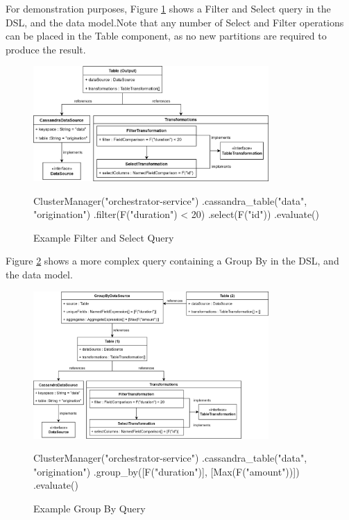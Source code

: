 For demonstration purposes, Figure \ref{fig:filter-select-query} shows a Filter and Select query in the DSL, and the data model.Note that any number of Select and Filter operations can be placed in the Table component, as no new partitions are required to produce the result.

\begin{figure}[h]
	\centering
	\includegraphics[width=0.8\textwidth]{chapters/diagrams/implementation/filter-select-query}
	\begin{python}
ClusterManager("orchestrator-service")
.cassandra_table("data", "origination")
.filter(F("duration") < 20)
.select(F("id"))
.evaluate()
	\end{python}
	\caption{Example Filter and Select Query}
	\label{fig:filter-select-query}
\end{figure}


Figure \ref{fig:group-by-query} shows a more complex query containing a Group By in the DSL, and the data model.

\begin{figure}[h]
	\centering
	\includegraphics[width=0.8\textwidth]{chapters/diagrams/implementation/group-by-query}
	\linebreak
	\begin{python}
ClusterManager("orchestrator-service")
.cassandra_table("data", "origination")
.group_by([F("duration")], [Max(F("amount"))])
.evaluate()
	\end{python}
	\caption{Example Group By Query}
	\label{fig:group-by-query}
\end{figure}

